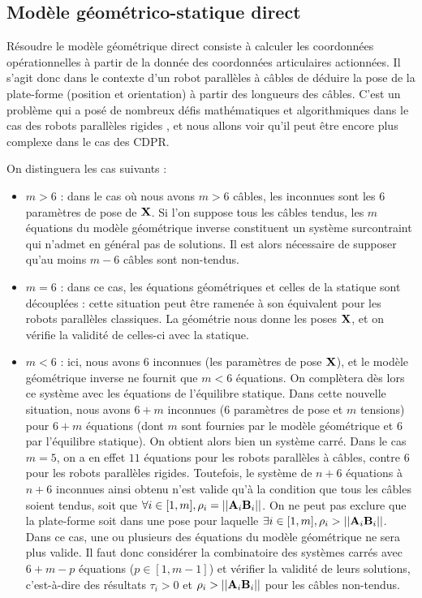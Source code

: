 \subsection{Modèle géométrico-statique direct}\label{chap0-1-4}

Résoudre le modèle géométrique direct consiste à calculer les coordonnées 
opéra\-tionnelles à partir de la donnée des coordonnées articulaires 
actionn\'ees. Il s'agit donc dans le contexte d'un robot parallèles à câbles de 
déduire la pose de la plate-forme (position et orientation) à partir des 
longueurs des câbles. C'est un problème qui a posé de nombreux défis 
mathématiques et algorithmiques dans le cas des robots parallèles rigides 
\cite{merlet1997robots}, et nous allons voir qu'il peut \^etre encore plus 
complexe dans le cas des CDPR.

On distinguera les cas suivants :
\begin{itemize}
  \item $m > 6$ : dans le cas o\`u nous avons $m > 6$ c\^ables, les inconnues 
sont les $6$ param\`etres de pose de $\bf X$. Si l'on suppose tous les c\^ables 
tendus, les $m$ \'equations du mod\`ele g\'eom\'etrique inverse constituent un 
syst\`eme surcontraint qui n'admet en g\'en\'eral pas de solutions. Il est 
alors n\'ecessaire de supposer qu'au moins $m-6$ c\^ables sont non-tendus.
  \item $m = 6$ : dans ce cas, les \'equations g\'eom\'etriques et celles de la 
statique sont d\'ecoupl\'ees : cette situation peut \^etre ramen\'ee \`a son 
\'equivalent pour les robots parall\`eles classiques. La g\'eom\'etrie 
nous donne les poses $\bf X$, et on v\'erifie la validit\'e de celles-ci avec 
la statique.
  \item $m < 6$ : ici, nous avons $6$ inconnues (les param\`etres de 
pose $\bf X$), et le mod\`ele g\'eom\'etrique inverse ne fournit que $m < 6$ 
\'equations. On compl\`etera d\`es lors ce syst\`eme avec les \'equations de 
l'\'equilibre statique. Dans cette nouvelle situation, nous avons $6 + m$ 
inconnues ($6$ param\`etres de pose et $m$ tensions) pour $6 + m$ \'equations 
(dont $m$ sont fournies par le mod\`ele g\'eom\'etrique et $6$ par l'\'equilibre 
statique). On obtient alors bien un syst\`eme carr\'e. Dans le cas 
$m = 5$, on a en effet $11$ \'equations pour les robots parall\`eles \`a 
c\^ables, contre $6$ pour les robots parall\`eles rigides. Toutefois, le 
syst\`eme de $n+6$ \'equations \`a $n+6$ inconnues ainsi obtenu n'est valide 
qu'\`a la condition que tous les c\^ables soient tendus, soit que $\forall i 
\in [1,m], \rho_i = ||{\bf A}_i{\bf B}_i||$. On ne peut pas exclure que la 
plate-forme soit dans une pose pour la\-quelle $\exists i \in [1,m], \rho_i > 
||{\bf A}_i{\bf B}_i||$. Dans ce cas, une ou plusieurs des \'equations du 
mod\`ele g\'eom\'etrique ne sera plus valide. Il faut donc consid\'erer la 
combinatoire des syst\`emes carr\'es avec $6+m-p$ \'equations ($p \in [1, 
m-1]$) et v\'erifier la validit\'e de leurs solutions, c'est-\`a-dire des 
r\'esultats $\tau_i > 0$ et $\rho_i > ||{\bf A}_i{\bf B}_i||$ pour les 
c\^ables non-tendus. 
\end{itemize}

